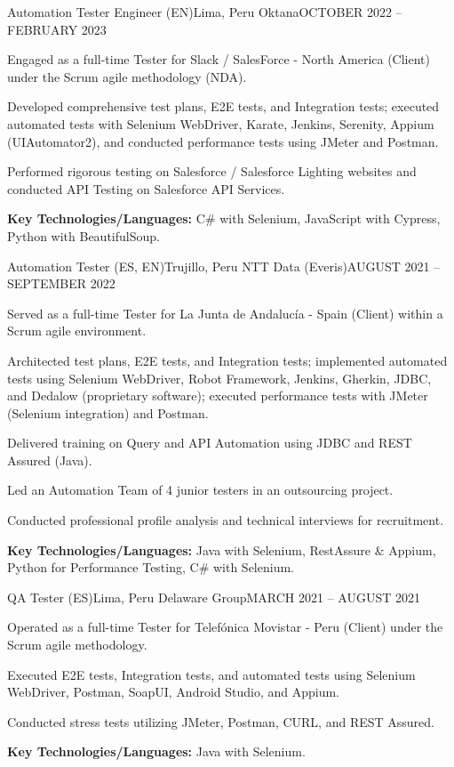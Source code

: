 \resumeSubheading
  {Automation Tester Engineer (EN)}{Lima, Peru}
  {Oktana}{OCTOBER 2022 -- FEBRUARY 2023}
\resumeItemListStart
    \item Engaged as a full-time Tester for Slack / SalesForce - North America (Client) under the Scrum agile methodology (NDA).
    \item Developed comprehensive test plans, E2E tests, and Integration tests; executed automated tests with Selenium WebDriver, Karate, Jenkins, Serenity, Appium (UIAutomator2), and conducted performance tests using JMeter and Postman.
    \item Performed rigorous testing on Salesforce / Salesforce Lighting websites and conducted API Testing on Salesforce API Services.
    \item \textbf{Key Technologies/Languages:} C\# with Selenium, JavaScript with Cypress, Python with BeautifulSoup.
\resumeItemListEnd

\resumeSubheading
  {Automation Tester (ES, EN)}{Trujillo, Peru}
  {NTT Data (Everis)}{AUGUST 2021 -- SEPTEMBER 2022}
\resumeItemListStart
    \item Served as a full-time Tester for La Junta de Andalucía - Spain (Client) within a Scrum agile environment.
    \item Architected test plans, E2E tests, and Integration tests; implemented automated tests using Selenium WebDriver, Robot Framework, Jenkins, Gherkin, JDBC, and Dedalow (proprietary software); executed performance tests with JMeter (Selenium integration) and Postman.
    \item Delivered training on Query and API Automation using JDBC and REST Assured (Java).
    \item Led an Automation Team of 4 junior testers in an outsourcing project.
    \item Conducted professional profile analysis and technical interviews for recruitment.
    \item \textbf{Key Technologies/Languages:} Java with Selenium, RestAssure \& Appium, Python for Performance Testing, C\# with Selenium.
\resumeItemListEnd

\resumeSubheading
  {QA Tester (ES)}{Lima, Peru}
  {Delaware Group}{MARCH 2021 -- AUGUST 2021}
\resumeItemListStart
    \item Operated as a full-time Tester for Telefónica Movistar - Peru (Client) under the Scrum agile methodology.
    \item Executed E2E tests, Integration tests, and automated tests using Selenium WebDriver, Postman, SoapUI, Android Studio, and Appium.
    \item Conducted stress tests utilizing JMeter, Postman, CURL, and REST Assured.
    \item \textbf{Key Technologies/Languages:} Java with Selenium.
\resumeItemListEnd

